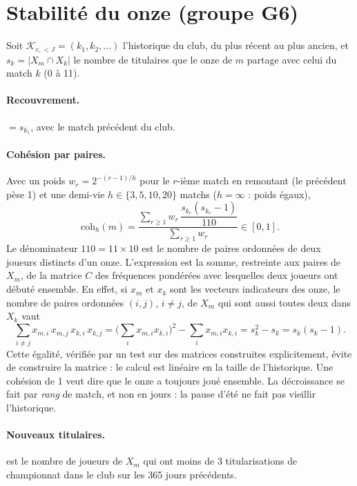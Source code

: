 \section{Stabilité du onze (groupe G6)}
\label{sec:g6}

Soit \(\mathcal{K}_{e,<J} = (k_1, k_2, \dots)\) l'historique du club, du plus récent au plus ancien, et
\(s_k = |X_m \cap X_k|\) le nombre de titulaires que le onze de \(m\) partage avec celui du match \(k\)
(0 à 11).

\paragraph{Recouvrement.}  \(= s_{k_1}\), avec le match précédent du club.

\paragraph{Cohésion par paires.} Avec un poids \(w_r = 2^{-(r - 1)/h}\) pour le \(r\)-ième match en
remontant (le précédent pèse 1) et une demi-vie \(h \in \{3, 5, 10, 20\}\) matchs (\(h = \infty\) : poids
égaux),
\[
  \mathrm{coh}_h(m) = \frac{\sum_{r \ge 1} w_r\, \dfrac{s_{k_r}(s_{k_r} - 1)}{110}}{\sum_{r \ge 1} w_r}
  \in [0, 1].
\]
Le dénominateur \(110 = 11 \times 10\) est le nombre de paires ordonnées de deux joueurs distincts d'un
onze. L'expression est la somme, restreinte aux paires de \(X_m\), de la matrice \(C\) des fréquences
pondérées avec lesquelles deux joueurs ont débuté ensemble. En effet, si \(x_m\) et \(x_k\) sont les
vecteurs indicateurs des onze, le nombre de paires ordonnées \((i, j)\), \(i \ne j\), de \(X_m\) qui sont
aussi toutes deux dans \(X_k\) vaut
\[
  \sum_{i \ne j} x_{m,i}\, x_{m,j}\, x_{k,i}\, x_{k,j}
  = \Big(\sum_i x_{m,i} x_{k,i}\Big)^2 - \sum_i x_{m,i} x_{k,i}
  = s_k^2 - s_k = s_k(s_k - 1).
\]
Cette égalité, vérifiée par un test sur des matrices construites explicitement, évite de construire la
matrice : le calcul est linéaire en la taille de l'historique. Une cohésion de 1 veut dire que le onze a
toujours joué ensemble. La décroissance se fait par \emph{rang} de match, et non en jours : la pause d'été
ne fait pas vieillir l'historique.

\paragraph{Nouveaux titulaires.}  est le nombre de joueurs de \(X_m\) qui ont moins
de 3 titularisations de championnat dans le club sur les 365 jours précédents.

